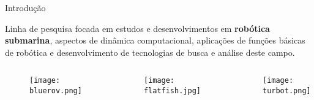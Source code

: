 \begin{frame}[t]{Introdução} 
    \transdissolve[duration=0.5]
   
    Linha de pesquisa focada em estudos e desenvolvimentos em \textbf{robótica submarina}, aspectos de dinâmica computacional, aplicações de funções básicas de robótica e desenvolvimento de tecnologias de busca e análise deste campo.

   
        \begin{columns}[t]
            
            \begin{center}
            \begin{figure}
                \texttt{[image: bluerov.png]}
               
               
                  
               
            \end{figure}

            \end{center}
            \vspace*{0.6cm}
            \begin{center}
          
                \begin{figure}
                    
                    \texttt{[image: flatfish.jpg]}
                \end{figure}
            \end{center}
            
            \begin{center}
            \vspace*{0.4cm}
            \begin{figure}
                \texttt{[image: turbot.png]}
            \end{figure}
            \end{center}
        \end{columns}
\end{frame}
